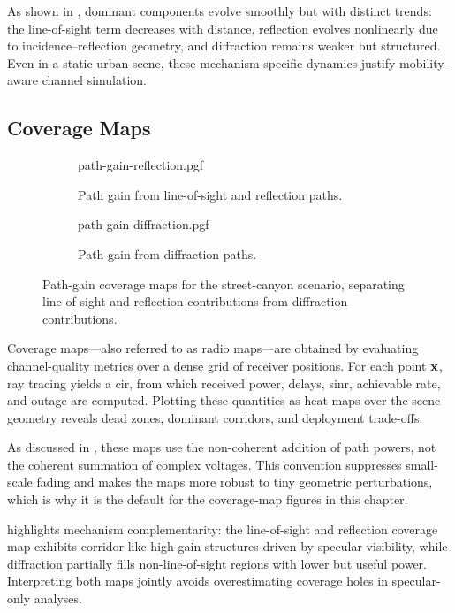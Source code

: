 As shown in , dominant components evolve smoothly but with distinct trends: the \gls{line-of-sight} term decreases with distance, reflection evolves nonlinearly due to incidence--reflection geometry, and diffraction remains weaker but structured. Even in a static urban scene, these mechanism-specific dynamics justify mobility-aware channel simulation.

\subsection{Coverage Maps}

\begin{figure}
  \centering
  \begin{subfigure}[t]{0.49\contentwidth}
    \centering
    {path-gain-reflection.pgf}
    \caption{Path gain from \gls{line-of-sight} and reflection paths.}
  \end{subfigure}
  \hfill
  \begin{subfigure}[t]{0.49\contentwidth}
    \centering
    {path-gain-diffraction.pgf}
    \caption{Path gain from diffraction paths.}
  \end{subfigure}
  \caption{Path-gain coverage maps for the street-canyon scenario, separating \gls{line-of-sight} and reflection contributions from diffraction contributions.}
\end{figure}

Coverage maps---also referred to as radio maps---are obtained by evaluating channel-quality metrics over a dense grid of receiver positions. For each point $\mathbf{x}$, ray tracing yields a \gls{cir}, from which received power, delays, \gls{sinr}, achievable rate, and outage are computed. Plotting these quantities as heat maps over the scene geometry reveals dead zones, dominant corridors, and deployment trade-offs.

As discussed in , these maps use the non-coherent addition of path powers, not the coherent summation of complex voltages. This convention suppresses small-scale fading and makes the maps more robust to tiny geometric perturbations, which is why it is the default for the coverage-map figures in this chapter.

 highlights mechanism complementarity: the \gls{line-of-sight} and reflection coverage map exhibits corridor-like high-gain structures driven by specular visibility, while diffraction partially fills non-\gls{line-of-sight} regions with lower but useful power. Interpreting both maps jointly avoids overestimating coverage holes in specular-only analyses.

